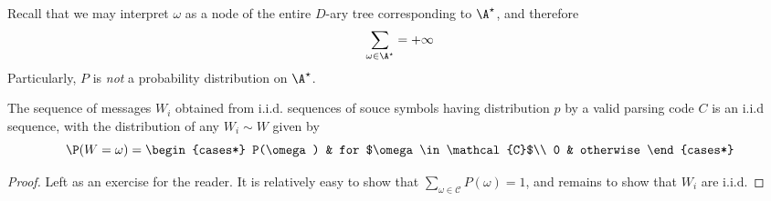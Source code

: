 \documentclass[toc]{../cs-classes/cs-classes}
\begin{document}
\begin{remark}
    Recall that we may interpret $\omega$ as a node of the entire $D$-ary tree corresponding to $\A^\star$, and therefore
    \begin{equation*}
        \sum_{\omega\in\A^\star} = +\infty
    \end{equation*}
    Particularly, $P$ is \emph{not} a probability distribution on $\A^\star$.
\end{remark}

\begin{lemma}
    \label{lem:distribution-parsed-messages}
    The sequence of messages $W_i$ obtained from i.i.d. sequences of souce symbols having distribution $p$ by a valid parsing code $C$ is an i.i.d sequence, with the distribution of any $W_i\sim W$ given by
    \begin{equation}
        \label{eq:def-P}
        \P(W=\omega) = \begin{cases*}
            P(\omega) & for $\omega\in\mathcal{C}$\\
            0 & otherwise
        \end{cases*}
    \end{equation}
\end{lemma}
\begin{proof}
    Left as an exercise for the reader. It is relatively easy to show that $\sum_{\omega\in\mathcal{C}}P(\omega)=1$, and remains to show that $W_i$ are i.i.d.
\end{proof}
\end{document}
